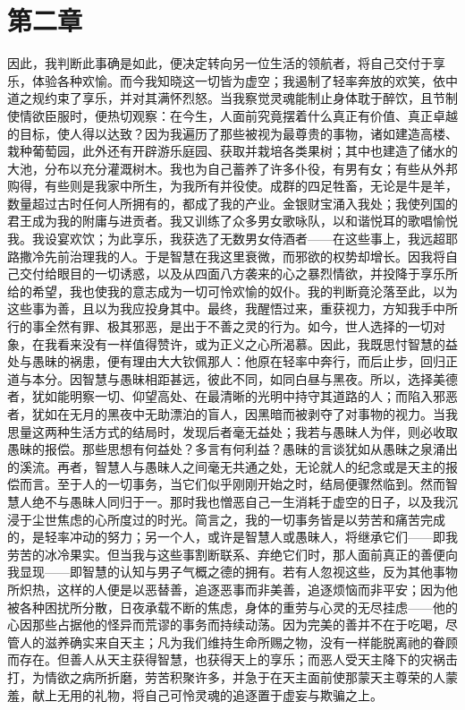 
\section{第二章}

因此，我判断此事确是如此，便决定转向另一位生活的领航者，将自己交付于享乐，体验各种欢愉。而今我知晓这一切皆为虚空；我遏制了轻率奔放的欢笑，依中道之规约束了享乐，并对其满怀烈怒。当我察觉灵魂能制止身体耽于醉饮，且节制使情欲臣服时，便热切观察：在今生，人面前究竟摆着什么真正有价值、真正卓越的目标，使人得以达致？因为我遍历了那些被视为最尊贵的事物，诸如建造高楼、栽种葡萄园，此外还有开辟游乐庭园、获取并栽培各类果树；其中也建造了储水的大池，分布以充分灌溉树木。我也为自己蓄养了许多仆役，有男有女；有些从外邦购得，有些则是我家中所生，为我所有并役使。成群的四足牲畜，无论是牛是羊，数量超过古时任何人所拥有的，都成了我的产业。金银财宝涌入我处；我使列国的君王成为我的附庸与进贡者。我又训练了众多男女歌咏队，以和谐悦耳的歌唱愉悦我。我设宴欢饮；为此享乐，我获选了无数男女侍酒者——在这些事上，我远超耶路撒冷先前治理我的人。于是智慧在我这里衰微，而邪欲的权势却增长。因我将自己交付给眼目的一切诱惑，以及从四面八方袭来的心之暴烈情欲，并投降于享乐所给的希望，我也使我的意志成为一切可怜欢愉的奴仆。我的判断竟沦落至此，以为这些事为善，且以为我应投身其中。最终，我醒悟过来，重获视力，方知我手中所行的事全然有罪、极其邪恶，是出于不善之灵的行为。如今，世人选择的一切对象，在我看来没有一样值得赞许，或为正义之心所渴慕。因此，我既思忖智慧的益处与愚昧的祸患，便有理由大大钦佩那人：他原在轻率中奔行，而后止步，回归正道与本分。因智慧与愚昧相距甚远，彼此不同，如同白昼与黑夜。所以，选择美德者，犹如能明察一切、仰望高处、在最清晰的光明中持守其道路的人；而陷入邪恶者，犹如在无月的黑夜中无助漂泊的盲人，因黑暗而被剥夺了对事物的视力。当我思量这两种生活方式的结局时，发现后者毫无益处；我若与愚昧人为伴，则必收取愚昧的报偿。那些思想有何益处？多言有何利益？愚昧的言谈犹如从愚昧之泉涌出的溪流。再者，智慧人与愚昧人之间毫无共通之处，无论就人的纪念或是天主的报偿而言。至于人的一切事务，当它们似乎刚刚开始之时，结局便骤然临到。然而智慧人绝不与愚昧人同归于一。那时我也憎恶自己一生消耗于虚空的日子，以及我沉浸于尘世焦虑的心所度过的时光。简言之，我的一切事务皆是以劳苦和痛苦完成的，是轻率冲动的努力；另一个人，或许是智慧人或愚昧人，将继承它们——即我劳苦的冰冷果实。但当我与这些事割断联系、弃绝它们时，那人面前真正的善便向我显现——即智慧的认知与男子气概之德的拥有。若有人忽视这些，反为其他事物所炽热，这样的人便是以恶替善，追逐恶事而非美善，追逐烦恼而非平安；因为他被各种困扰所分散，日夜承载不断的焦虑，身体的重劳与心灵的无尽挂虑——他的心因那些占据他的怪异而荒谬的事务而持续动荡。因为完美的善并不在于吃喝，尽管人的滋养确实来自天主；凡为我们维持生命所赐之物，没有一样能脱离祂的眷顾而存在。但善人从天主获得智慧，也获得天上的享乐；而恶人受天主降下的灾祸击打，为情欲之病所折磨，劳苦积聚许多，并急于在天主面前使那蒙天主尊荣的人蒙羞，献上无用的礼物，将自己可怜灵魂的追逐置于虚妄与欺骗之上。\par

